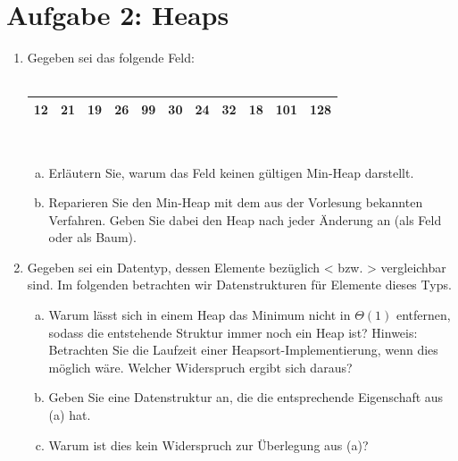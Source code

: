 \documentclass{scrartcl}
\begin{document}
\section*{Aufgabe 2: Heaps}
\begin{enumerate}[(1)]
\item Gegeben sei das folgende Feld: \\
\ \\
\begin{tabular}{|c|c|c|c|c|c|c|c|c|c|c|}
\hline
12 & 21 & 19 & 26 & 99 & 30 & 24 & 32 & 18 & 101 & 128 \\ 
\hline 
\end{tabular} \\
\begin{enumerate}[(a)]
	\item Erläutern Sie, warum das Feld keinen gültigen Min-Heap darstellt.
	\item Reparieren Sie den Min-Heap mit dem aus der Vorlesung bekannten Verfahren. Geben Sie dabei den Heap nach jeder Änderung an (als Feld oder als Baum).
\end{enumerate}
\item Gegeben sei ein Datentyp, dessen Elemente bez\"uglich < bzw. > vergleichbar sind. Im folgenden betrachten wir Datenstrukturen f\"ur Elemente dieses Typs.
\begin{enumerate}[(a)]
	\item Warum l\"asst sich in einem Heap das Minimum nicht in $\Theta(1)$ entfernen, sodass die entstehende Struktur immer noch ein Heap ist? \newline
Hinweis: Betrachten Sie die Laufzeit einer Heapsort-Implementierung, wenn dies möglich wäre. Welcher Widerspruch ergibt sich daraus?

	\item Geben Sie eine Datenstruktur an, die die entsprechende Eigenschaft aus (a) hat.

	\item Warum ist dies kein Widerspruch zur \"Uberlegung aus (a)?
\end{enumerate}
\end{enumerate}
\end{document}
